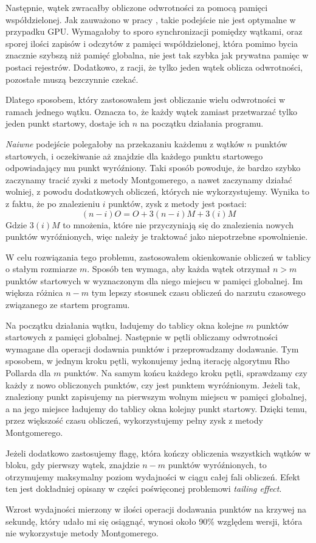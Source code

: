 Następnie, wątek zwracałby obliczone odwrotności za pomocą pamięci współdzielonej.
Jak zauważono w pracy \cite{Boss2015}, takie podejście nie jest optymalne w przypadku GPU.
Wymagałoby to sporo synchronizacji pomiędzy wątkami, oraz sporej ilości zapisów i odczytów
z pamięci współdzielonej, która pomimo bycia znacznie szybszą niż pamięć globalna, nie jest tak
szybka jak prywatna pamięc w postaci rejestrów. Dodatkowo, z racji, że tylko jeden
wątek oblicza odwrotności, pozostałe muszą bezczynnie czekać.
\par
Dlatego sposobem, który zastosowałem jest obliczanie wielu odwrotności
w ramach jednego wątku. Oznacza to, że każdy wątek zamiast przetwarzać tylko jeden punkt startowy,
dostaje ich $n$ na początku działania programu.
\par
\textit{Naiwne} podejście polegałoby na przekazaniu każdemu z wątków $n$ punktów startowych,
i oczekiwanie aż znajdzie dla każdego punktu startowego odpowiadający mu punkt wyróźniony. Taki sposób powoduje,
że bardzo szybko zaczynamy tracić zyski z metody Montgomerego, a nawet zaczynamy działać wolniej,
z powodu dodatkowych obliczeń, których nie wykorzystujemy.
Wynika to z faktu,
że po znalezieniu $i$ punktów, zysk z metody jest postaci:
$$
    (n-i)O = O + 3(n-i)M + 3(i)M
$$
Gdzie $3(i)M$ to mnożenia, które nie przyczyniają się do znalezienia nowych punktów wyróźnionych, więc należy je traktować jako niepotrzebne spowolnienie.
\par
W celu rozwiązania tego problemu, zastosowałem okienkowanie obliczeń w tablicy o stałym rozmiarze $m$.
Sposób ten wymaga, aby każda wątek otrzymał $n > m$ punktów startowych w wyznaczonym dla niego miejscu w pamięci globalnej.
Im większa różnica $n-m$ tym lepszy
stosunek czasu obliczeń do narzutu czasowego związanego ze startem programu.
\par
Na początku działania wątku, ładujemy do tablicy okna kolejne $m$ punktów startowych z pamięci globalnej.
Następnie w pętli obliczamy odwrotności wymagane dla operacji dodawnia punktów i przeprowadzamy dodawanie. Tym sposobem,
w jednym kroku pętli, wykonujemy jedną iterację algorytmu Rho Pollarda dla $m$ punktów. Na samym końcu każdego kroku pętli,
sprawdzamy czy każdy z nowo obliczonych punktów, czy jest punktem wyróźnionym. Jeżeli tak,
znaleziony punkt zapisujemy na pierwszym wolnym miejscu w pamięci globalnej, a na jego miejsce ładujemy do tablicy
okna kolejny punkt startowy.
Dzięki temu, przez większość czasu obliczeń, wykorzystujemy pełny zysk z metody Montgomerego.
\par
Jeżeli dodatkowo zastosujemy flagę, która kończy obliczenia wszystkich wątków w bloku, gdy pierwszy wątek,
znajdzie $n-m$ punktów wyróźnionych, to otrzymujemy maksymalny poziom wydajności w ciągu całej fali obliczeń.
Efekt ten jest dokładniej opisany w części poświęconej problemowi \textit{tailing effect}.
\par
Wzrost wydajności mierzony w ilości operacji dodawania punktów na krzywej na sekundę, który udało mi się osiągnąć, wynosi około 90\% względem wersji, która nie wykorzystuje
metody Montgomerego.




